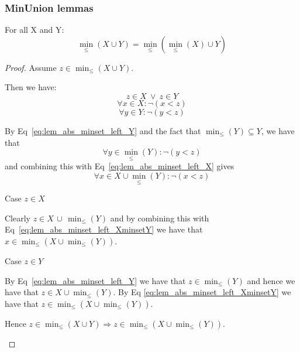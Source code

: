 \documentclass[../Summary.tex]{subfiles}
\begin{document}
\subsubsection{MinUnion lemmas}

\begin{lemma} \label{lem:minunion_left_absorption}
For all X and Y:
\begin{equation*}
\min_\leq(X \cup Y) = \min_\leq(\min_\leq(X) \cup Y)
\end{equation*}
\end{lemma}

\begin{proof}
Assume $z \in \min_\leq(X \cup Y)$. 
\begin{ind}
Then we have:
\begin{equation}
z \in X \ \vee \ z \in Y
\end{equation}
\begin{equation} \label{eq:lem_abs_minset_left_X}
\forall x \in X : \neg (x < z)
\end{equation}
\begin{equation} \label{eq:lem_abs_minset_left_Y}
\forall y \in Y : \neg (y < z)
\end{equation}

By Eq~\ref{eq:lem_abs_minset_left_Y} and the fact that $\min_\leq(Y) \subseteq Y$, we have that
\begin{equation*} 
\forall y \in \min_\leq(Y) : \neg (y < z)
\end{equation*}
and combining this with Eq~\ref{eq:lem_abs_minset_left_X} gives
\begin{equation} \label{eq:lem_abs_minset_left_XminsetY}
\forall x \in X \cup \min_\leq(Y) : \neg (x < z)
\end{equation}

Case $z \in X$
\begin{ind}
Clearly $z \in X \, \cup \, \min_\leq(Y)$ and by combining this with Eq~\ref{eq:lem_abs_minset_left_XminsetY} we have that $x \in \min_\leq(X \cup \min_\leq(Y))$.
\end{ind}

Case $z \in Y$
\begin{ind}
By Eq~\ref{eq:lem_abs_minset_left_Y} we have that $z \in \min_\leq(Y)$ and hence we have that $z \in X \cup \min_\leq(Y)$. By Eq \ref{eq:lem_abs_minset_left_XminsetY} we have that $z \in \min_\leq(X \cup \min_\leq(Y))$.
\end{ind}

Hence $z \in \min_\leq(X \cup Y) \Rightarrow z \in \min_\leq(X \cup \min_\leq(Y))$.
\end{ind}


\end{proof}
\end{document}
